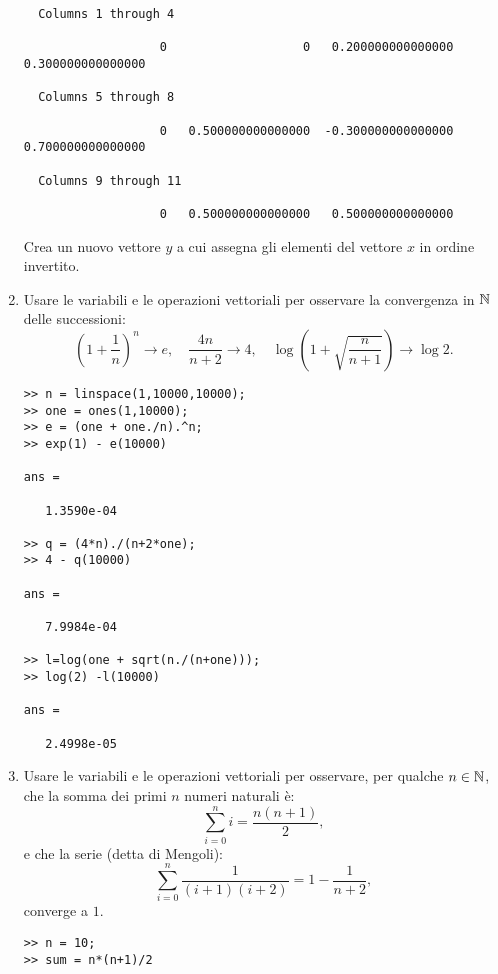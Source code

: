 \begin{enumerate}
\begin{svol}
\begin{codice}
\begin{verbatim}
  Columns 1 through 4

                   0                   0   0.200000000000000   0.300000000000000

  Columns 5 through 8

                   0   0.500000000000000  -0.300000000000000   0.700000000000000

  Columns 9 through 11

                   0   0.500000000000000   0.500000000000000
\end{verbatim}
\end{codice}
Crea un nuovo vettore $y$ a cui assegna gli elementi del vettore $x$ in
ordine invertito.
\end{svol}

\item Usare le variabili e le operazioni vettoriali per osservare la convergenza
in $\mathbb{N}$ delle successioni:
\[
\left(1 + \frac{1}{n}\right)^n \rightarrow e,\quad
 \frac{4n}{n+2} \rightarrow 4,\quad
\log \left(1 + \sqrt{\frac{n}{n+1}} \right) \rightarrow \log 2.
\]
\begin{svol}
\begin{codice}
\begin{verbatim}
>> n = linspace(1,10000,10000);
>> one = ones(1,10000);
>> e = (one + one./n).^n;
>> exp(1) - e(10000)

ans =

   1.3590e-04

>> q = (4*n)./(n+2*one);
>> 4 - q(10000)

ans =

   7.9984e-04

>> l=log(one + sqrt(n./(n+one)));
>> log(2) -l(10000)

ans =

   2.4998e-05

\end{verbatim}
\end{codice}
\end{svol}

\item Usare le variabili e le operazioni vettoriali per osservare, per qualche
$n \in \mathbb{N}$, che la somma dei primi $n$ numeri naturali è:
\[\sum_{i=0}^{n}i = \frac{n(n+1)}{2},\]
e che la serie (detta di Mengoli): \[\sum_{i=0}^{n}\frac{1}{(i+1)(i+2)} = 
1 -\frac{1}{n+2},\]converge a $1$.

\begin{svol}
\begin{codice}
\begin{verbatim}
>> n = 10;
>> sum = n*(n+1)/2


\end{verbatim}
\end{codice}
\end{svol}
\end{enumerate}
